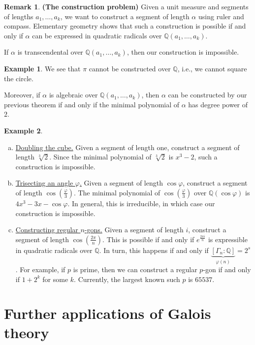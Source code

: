 \documentclass[10pt,letterpaper,cm]{nupset}
\theoremstyle{definition}
\newtheorem{exmp}{Example}
\newtheorem{remark}{Remark}
\newcommand{\Q}{\mathbb Q}
\newcommand{\1}{\mathbf{1}}
\newcommand{\0}{\vec 0}
\begin{document}
\begin{remark}{\textbf{(The construction problem)}}
Given a unit measure and segments of lengths $a_1, \ldots, a_k$, we want to construct a segment of length $\alpha$ using ruler and compass. Elementary geometry shows that such a construction is possible if and only if $\alpha$ can be expressed in quadratic radicals over $\Q(a_1, \ldots, a_k)$. 

If $\alpha$ is transcendental over $\Q(a_1, \ldots, a_k)$, then our construction is impossible. 
\begin{exmp}
We see that $\pi$ cannot be constructed over $\Q$, i.e., we cannot square the circle. 
\end{exmp} 
Moreover, if $\alpha$ is algebraic over $\Q(a_1, \ldots, a_k)$, then $\alpha$ can be constructed by our previous theorem if and only if the minimal polynomial of $\alpha$ has degree power of $2$.
\begin{exmp} $ $
\begin{enumerate}[(a)]
\item \underline{Doubling the cube.} Given a segment of length one, construct a segment of length $\sqrt[3]{2}$. Since the minimal polynomial of $\sqrt[3]{2}$ is $x^3-2$, such a construction is impossible.
\item \underline{Trisecting an angle $\varphi$.} Given a segment of length $\cos{\varphi}$, construct a segment of length $\cos(\frac{\varphi}{3})$. The minimal polynomial of $\cos(\frac{\varphi}{3})$ over $\Q(\cos{\varphi})$ is $4x^3 - 3x - \cos{\varphi}$. In general, this is irreducible, in which case our construction is impossible. 
\item \underline{Constructing regular $n$-gons.} Given a segment of length $i$, construct a segment of length $\cos(\frac{2\pi}{n})$. This is possible if and only if $e^{\frac{2\pi i}{n}}$ is expressible in quadratic radicals over $\Q$. In turn, this happens if and only if $\underbrace{[\Gamma_n : \Q]}_{\varphi(n)} = 2^s$. For example, if $p$ is prime, then we can construct a regular $p$-gon if and only if $1+2^k$ for some $k$. Currently, the largest known such $p$ is $\num{65537}$.
\end{enumerate}
\end{exmp}
\end{remark}

\section{Further applications of Galois theory}
\end{document}
